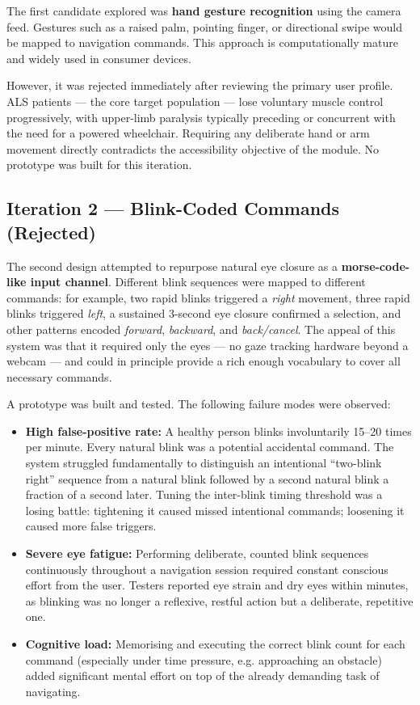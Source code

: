 The first candidate explored was \textbf{hand gesture recognition} using the camera feed.
Gestures such as a raised palm, pointing finger, or directional swipe would be mapped to
navigation commands. This approach is computationally mature and widely used in consumer
devices.

However, it was rejected immediately after reviewing the primary user profile. ALS patients
— the core target population — lose voluntary muscle control progressively, with upper-limb
paralysis typically preceding or concurrent with the need for a powered wheelchair.
Requiring any deliberate hand or arm movement directly contradicts the accessibility
objective of the module. No prototype was built for this iteration.

\subsection{Iteration 2 — Blink-Coded Commands (Rejected)}

The second design attempted to repurpose natural eye closure as a \textbf{morse-code-like
input channel}. Different blink sequences were mapped to different commands: for example,
two rapid blinks triggered a \textit{right} movement, three rapid blinks triggered
\textit{left}, a sustained 3-second eye closure confirmed a selection, and other patterns
encoded \textit{forward}, \textit{backward}, and \textit{back/cancel}. The appeal of this
system was that it required only the eyes — no gaze tracking hardware beyond a webcam — and
could in principle provide a rich enough vocabulary to cover all necessary commands.

A prototype was built and tested. The following failure modes were observed:

\begin{itemize}
    \item \textbf{High false-positive rate:} A healthy person blinks involuntarily 15--20
    times per minute. Every natural blink was a potential accidental command. The system
    struggled fundamentally to distinguish an intentional ``two-blink right'' sequence from
    a natural blink followed by a second natural blink a fraction of a second later. Tuning
    the inter-blink timing threshold was a losing battle: tightening it caused missed
    intentional commands; loosening it caused more false triggers.

    \item \textbf{Severe eye fatigue:} Performing deliberate, counted blink sequences
    continuously throughout a navigation session required constant conscious effort from the
    user. Testers reported eye strain and dry eyes within minutes, as blinking was no longer
    a reflexive, restful action but a deliberate, repetitive one.

    \item \textbf{Cognitive load:} Memorising and executing the correct blink count for each
    command (especially under time pressure, e.g. approaching an obstacle) added significant
    mental effort on top of the already demanding task of navigating.
\end{itemize}

